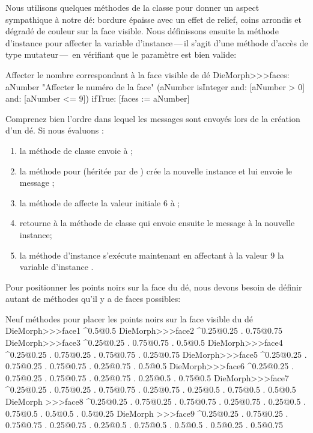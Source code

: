 \documentclass[a4paper,10pt,twoside]{book}
\begin{document}
Nous utilisons quelques m\'ethodes de la classe 
pour donner un aspect sympathique \`a notre d\'e: bordure \'epaisse
avec un effet de relief, coins arrondis et d\'egrad\'e de couleur sur
la face visible.
Nous d\'efinissons ensuite la m\'ethode d'instance  pour
affecter la variable d'instance\,---\,il s'agit d'une m\'ethode
d'acc\`es de type mutateur\,---\, en v\'erifiant que le param\`etre est
bien valide:
\begin{method}{Affecter le nombre correspondant \`a la face visible de d\'e}
DieMorph>>>faces: aNumber
	"Affecter le num\'ero de la face"
	(aNumber isInteger
			and: [aNumber > 0]
			and: [aNumber <= 9])
		ifTrue: [faces := aNumber]
\end{method}

Comprenez bien l'ordre dans lequel les messages sont envoy\'es lors de
la cr\'eation d'un d\'e. Si nous \'evaluons :
\begin{enumerate}
	\item la m\'ethode de classe  envoie
       \`a ;
	\item la m\'ethode pour  (h\'erit\'ee par  de ) cr\'ee la nouvelle instance et lui envoie
       le message ;
	\item la m\'ethode  de  affecte la
      valeur initiale 6 \`a ;
	\item {} retourne \`a la m\'ethode de
      classe  qui envoie ensuite le
      message  \`a la nouvelle instance;
	\item la m\'ethode d'instance  s'ex\'ecute
      maintenant en affectant \`a la valeur 9 la variable d'instance
      .
\end{enumerate}

Pour positionner les points noirs sur la face du d\'e, nous devons
besoin de d\'efinir autant de m\'ethodes qu'il y a de faces possibles:

\begin{methods}{Neuf m\'ethodes pour placer les points noirs sur la face visible du d\'e}
DieMorph>>>face1
	^{0.5@0.5}
DieMorph>>>face2
	^{0.25@0.25 . 0.75@0.75}
DieMorph>>>face3
	^{0.25@0.25 . 0.75@0.75 . 0.5@0.5}
DieMorph>>>face4
	^{0.25@0.25 . 0.75@0.25 . 0.75@0.75 . 0.25@0.75}
DieMorph>>>face5
	^{0.25@0.25 . 0.75@0.25 . 0.75@0.75 . 0.25@0.75 . 0.5@0.5}
DieMorph>>>face6
	^{0.25@0.25 . 0.75@0.25 . 0.75@0.75 . 0.25@0.75 . 0.25@0.5 . 0.75@0.5}
DieMorph>>>face7
	^{0.25@0.25 . 0.75@0.25 . 0.75@0.75 . 0.25@0.75 . 0.25@0.5 . 0.75@0.5 . 0.5@0.5}
DieMorph >>>face8
	^{0.25@0.25 . 0.75@0.25 . 0.75@0.75 . 0.25@0.75 . 0.25@0.5 . 0.75@0.5 . 0.5@0.5 . 0.5@0.25}
DieMorph >>>face9
	^{0.25@0.25 . 0.75@0.25 . 0.75@0.75 . 0.25@0.75 . 0.25@0.5 . 0.75@0.5 . 0.5@0.5 . 0.5@0.25 . 0.5@0.75}
\end{methods}
\end{document}

